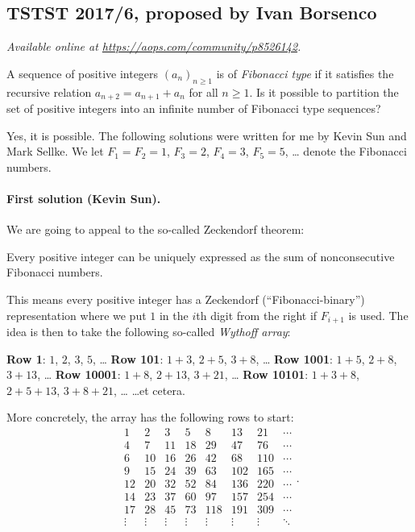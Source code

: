 \documentclass[11pt]{scrartcl}
\begin{document}
\subsection{TSTST 2017/6, proposed by Ivan Borsenco}
\textsl{Available online at \url{https://aops.com/community/p8526142}.}
\begin{mdframed}[style=mdpurplebox,frametitle={Problem statement}]
A sequence of positive integers $(a_{n})_{n \geq 1}$ is of
\emph{Fibonacci type} if it satisfies the recursive relation
$a_{n+2}=a_{n+1}+a_{n}$ for all $n \geq 1$.
Is it possible to partition the set of positive integers
into an infinite number of Fibonacci type sequences?
\end{mdframed}
Yes, it is possible.
The following solutions were written for me by Kevin Sun and Mark Sellke.
We let $F_1 = F_2 = 1$, $F_3 = 2$, $F_4 = 3$, $F_5 = 5$, \dots
denote the Fibonacci numbers.

\paragraph{First solution (Kevin Sun).}
We are going to appeal to the so-called Zeckendorf theorem:
\begin{theorem*}
  [Zeckendorf]
  Every positive integer can be uniquely expressed
  as the sum of nonconsecutive Fibonacci numbers.
\end{theorem*}
This means every positive integer has a
Zeckendorf (``Fibonacci-binary'') representation
where we put $1$ in the $i$th digit from the right
if $F_{i+1}$ is used.
The idea is then to take the following so-called \emph{Wythoff array}:
\begin{itemize}
  \ii \textbf{Row 1}: $1$, $2$, $3$, $5$, \dots
  \ii \textbf{Row 101}: $1+3$, $2+5$, $3+8$, \dots
  \ii \textbf{Row 1001}: $1+5$, $2+8$, $3+13$, \dots
  \ii \textbf{Row 10001}: $1+8$, $2+13$, $3+21$, \dots
  \ii \textbf{Row 10101}: $1+3+8$, $2+5+13$, $3+8+21$, \dots
  \ii \dots et cetera.
\end{itemize}
More concretely, the array has the following rows to start:
\[
\begin{matrix}
1&2&3&5&8&13&21&\dotsb\\
4&7&11&18&29&47&76&\dotsb\\
6&10&16&26&42&68&110&\dotsb\\
9&15&24&39&63&102&165&\dotsb\\
12&20&32&52&84&136&220&\dotsb\\
14&23&37&60&97&157&254&\dotsb\\
17&28&45&73&118&191&309&\dotsb\\
\vdots&\vdots&\vdots&\vdots&\vdots&\vdots&\vdots&\ddots\\
\end{matrix}.
\]
\end{document}
